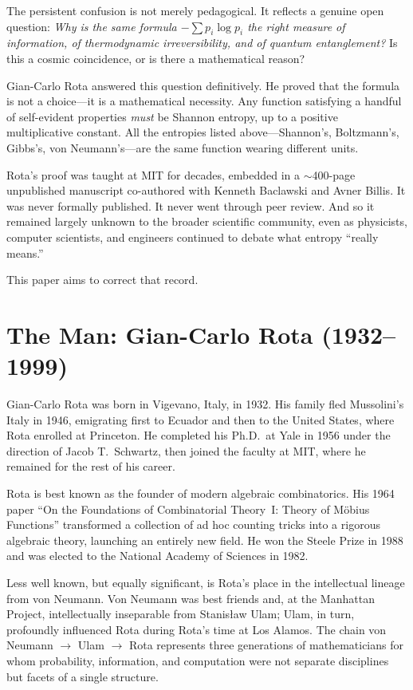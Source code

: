 \documentclass[12pt,a4paper]{article}
\theoremstyle{definition}
\begin{document}
The persistent confusion is not merely pedagogical.  It reflects a
genuine open question: \emph{Why is the same formula
$-\sum p_i \log p_i$ the right measure of information, of
thermodynamic irreversibility, and of quantum entanglement?}  Is this a
cosmic coincidence, or is there a mathematical reason?

Gian-Carlo Rota answered this question definitively.  He proved that the
formula is not a choice---it is a mathematical necessity.  Any function
satisfying a handful of self-evident properties \emph{must} be Shannon
entropy, up to a positive multiplicative constant.  All the entropies
listed above---Shannon's, Boltzmann's, Gibbs's, von Neumann's---are the
same function wearing different units.

Rota's proof was taught at MIT for decades, embedded in a
$\sim$400-page unpublished manuscript co-authored with Kenneth Baclawski
and Avner Billis.  It was never formally published.  It never went
through peer review.  And so it remained largely unknown to the broader
scientific community, even as physicists, computer scientists, and
engineers continued to debate what entropy ``really means.''

This paper aims to correct that record.

\section{The Man: Gian-Carlo Rota (1932--1999)}
\label{sec:rota}

Gian-Carlo Rota was born in Vigevano, Italy, in 1932.  His family fled
Mussolini's Italy in 1946, emigrating first to Ecuador and then to the
United States, where Rota enrolled at Princeton.  He completed his
Ph.D.\ at Yale in 1956 under the direction of Jacob T.~Schwartz, then
joined the faculty at MIT, where he remained for the rest of his career.

Rota is best known as the founder of modern algebraic combinatorics.
His 1964 paper ``On the Foundations of Combinatorial Theory~I: Theory of
M\"obius Functions'' transformed a collection of ad hoc counting tricks
into a rigorous algebraic theory, launching an entirely new field.  He
won the Steele Prize in 1988 and was elected to the National Academy of
Sciences in 1982.

Less well known, but equally significant, is Rota's place in the
intellectual lineage from von Neumann.  Von Neumann was best friends and, 
at the Manhattan Project, intellectually inseparable from
Stanis\l{}aw Ulam; Ulam, in turn, profoundly influenced Rota during
Rota's time at Los Alamos.  The chain von Neumann $\to$ Ulam $\to$ Rota
represents three generations of mathematicians for whom probability,
information, and computation were not separate disciplines but facets of
a single structure.
\end{document}
